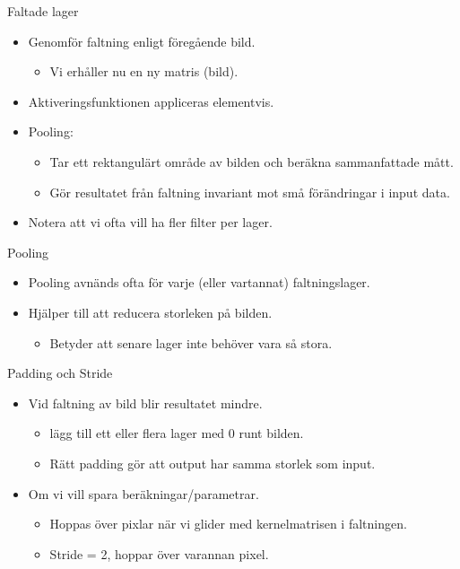 \documentclass[10pt,english]{beamer}
\begin{document}
\begin{frame}{Faltade lager}
    \begin{itemize}
        \item Genomför faltning enligt föregående bild.
        \begin{itemize}
            \item Vi erhåller nu en ny matris (bild).
        \end{itemize}
        \item Aktiveringsfunktionen appliceras elementvis.
        \item Pooling:
        \begin{itemize}
            \item Tar ett rektangulärt område av bilden och beräkna sammanfattade mått.
            \item Gör resultatet från faltning invariant mot små förändringar i input data.
        \end{itemize}
        \item Notera att vi ofta vill ha fler filter per lager.
    \end{itemize}
\end{frame}

\begin{frame}{Pooling}
    
    \begin{itemize}
        \item Pooling avnänds ofta för varje (eller vartannat) faltningslager.
        \item Hjälper till att reducera storleken på bilden.
        \begin{itemize}
            \item Betyder att senare lager inte behöver vara så stora.
        \end{itemize}
    \end{itemize}

\end{frame}

\begin{frame}{Padding och Stride}
    
    \begin{itemize}
        \item Vid faltning av bild blir resultatet mindre.
        \begin{itemize}
            \item {} lägg till ett eller flera lager med 0 runt bilden.
            \item Rätt padding gör att output har samma storlek som input.
        \end{itemize}
        \item Om vi vill spara beräkningar/parametrar.
        \begin{itemize}
            \item {} Hoppas över pixlar när vi glider med kernelmatrisen i faltningen.
            \item Stride = 2, hoppar över varannan pixel.
        \end{itemize}
    \end{itemize}

\end{frame}
\end{document}
